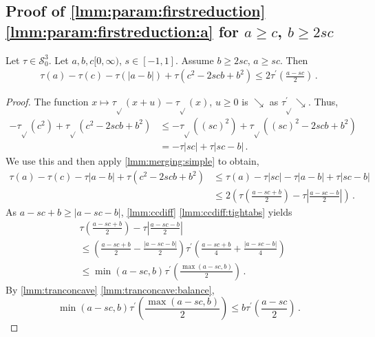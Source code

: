 \documentclass{article}
\newcommand{\lb}{\left(} %
\newcommand{\rb}{\right)} %
\newcommand{\br}[1]{\lb #1 \rb} %
\newcommand{\brOf}[1]{\!\br{#1}} %
\newcommand{\abs}[1]{\left| #1 \right|} %
\newcommand*{\mc}[1]{\mathcal{#1}}
\newcommand{\Rp}{[0, \infty)} %
\newcommand{\pr}{^\prime}
\newcommand{\equationFullstop}{\, .}
\newcommand{\eqfs}{\equationFullstop}
\newcommand{\tran}{\tau}
\newcommand{\trans}{\tran_{\!\sqrt{}}}
\newcommand{\dtrans}{\trans\pr}
\newcommand{\dtran}{\tran\pr}
\newcommand{\setccod}[1]{\mc S_0^{#1}}
\newcommand{\decr}{\searrow}
\begin{document}
\begin{appendix}
\subsection{Proof of \cref{lmm:param:firstreduction} \ref{lmm:param:firstreduction:a} for $a \geq c$, $b \geq 2sc$}\label{ssec:reduicLabGsc}
%
%
%
\begin{lemma}\label{lmm:param:reduicLabGsc}
	Let $\tran\in\setccod3$.
	Let $a,b,c\Rp$, $s\in[-1,1]$. Assume $b \geq 2sc$, $a\geq sc$.
	Then
	\begin{align*}
		\tran(a) - \tran(c) - \tran(\abs{a-b}) + \tran(c^2 - 2 s c b + b^2)
		\leq 
		2 \dtran\brOf{\frac{a - s c}2}
		\eqfs
	\end{align*}
\end{lemma}
%
\begin{proof}
	The function $x \mapsto \trans(x+u) - \trans(x)$, $u\geq0$ is $\decr$ as $\dtrans\decr$.
	Thus, 
	\begin{align*}
		-\trans(c^2) + \trans(c^2 - 2 s c b+b^2)
		 &\leq 
		-\trans((sc)^2) + \trans((sc)^2 - 2 s c b+b^2)
		\\&=
		-\tran|sc| + \tran|sc-b|
		\eqfs
	\end{align*}
	We use this and then apply \cref{lmm:merging:simple} to obtain,
	\begin{align*} 
		\tran(a) - \tran(c) - \tran|a-b| + \tran(c^2 - 2 s c b + b^2)
		&\leq 
		\tran(a) - \tran|sc| - \tran|a-b| + \tran|sc-b|
		\\&\leq 
		2 \br{\tran\brOf{\frac{a - s c + b}2} - \tran\abs{\frac{a - s c - b}2}}
		\eqfs
	\end{align*}	
	As $a - s c + b \geq \abs{a - s c - b}$, \cref{lmm:ccdiff} \ref{lmm:ccdiff:tightabs} yields
	\begin{align*}
		&\tran\brOf{\frac{a - s c + b}2} - \tran\abs{\frac{a - s c - b}2} 
		\\&\leq 
		\br{\frac{a - s c + b}2 - \frac{\abs{a - s c - b}}2} \dtran\brOf{\frac{a - s c + b}4 + \frac{\abs{a - s c - b}}4}
		\\&\leq 
		\min(a-sc, b) \dtran\brOf{\frac{\max(a-sc, b)}2}
		\eqfs
	\end{align*}
	By \cref{lmm:tranconcave} \ref{lmm:tranconcave:balance},
	\begin{equation}
		\min(a-sc, b) \dtran\brOf{\frac{\max(a-sc, b)}2}
		\leq
		b \dtran\brOf{\frac{a-sc}2}
		\eqfs
	\end{equation}
\end{proof}
%
%
%

\end{appendix}
\end{document}
